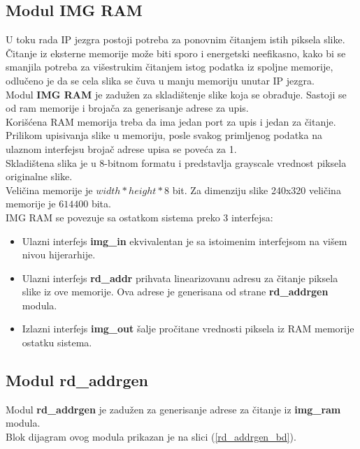 \subsection{Modul IMG RAM}

U toku rada IP jezgra postoji potreba za ponovnim čitanjem istih piksela slike.
Čitanje iz eksterne memorije može biti sporo i energetski neefikasno, kako bi se
smanjila potreba za višestrukim čitanjem istog podatka iz spoljne memorije,
odlučeno je da se cela slika se čuva u manju memoriju unutar IP jezgra. \\

Modul \textbf{IMG RAM} je zadužen za skladištenje slike koja se obrađuje.
Sastoji se od \gls{ram} memorije i brojača za generisanje adrese za upis. \\
Korišćena RAM memorija treba da ima jedan port za upis i jedan za čitanje.\\

Prilikom upisivanja slike u memoriju, posle svakog primljenog podatka na ulaznom
interfejsu brojač adrese upisa se poveća za 1. \\

Skladištena slika je u 8-bitnom formatu i predstavlja grayscale vrednost piksela
originalne slike. \\
Veličina memorije je $width*height*8$ bit. Za dimenziju slike 240x320
veličina memorije je $614400$ bita. \\

IMG RAM se povezuje sa ostatkom sistema preko 3 interfejsa:
\begin{itemize}
  \item Ulazni interfejs \textbf{img\_in} ekvivalentan je sa istoimenim
    interfejsom na višem nivou hijerarhije.
  \item Ulazni interfejs \textbf{rd\_addr} prihvata linearizovanu adresu za
    čitanje piksela slike iz ove memorije.
    Ova adrese je generisana od strane \textbf{rd\_addrgen} modula.
  \item Izlazni interfejs \textbf{img\_out} šalje pročitane vrednosti piksela iz
    RAM memorije ostatku sistema.
\end{itemize}

\newpage

\subsection{Modul rd\_addrgen}

Modul \textbf{rd\_addrgen} je zadužen za generisanje adrese za čitanje iz
\textbf{img\_ram} modula. \\
Blok dijagram ovog modula prikazan je na slici (\ref{rd_addrgen_bd}). \\

